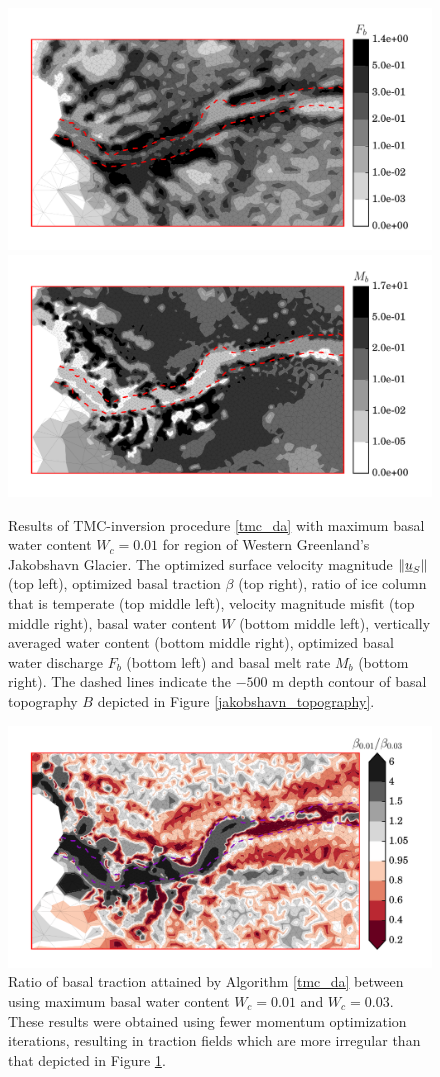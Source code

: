 \begin{figure}
    \includegraphics[width=0.48\linewidth]{images/internal_energy/jakob_results/inversion_Wc_0.01/Fb.pdf}
    \quad
    \includegraphics[width=0.48\linewidth]{images/internal_energy/jakob_results/inversion_Wc_0.01/Mb.pdf}
  \caption[Jakobshavn simulation results]{Results of TMC-inversion procedure \ref{tmc_da} with maximum basal water content $W_c = 0.01$ for region of Western Greenland's Jakobshavn Glacier.  The optimized surface velocity magnitude $\Vert \underline{u}_S \Vert$ (top left), optimized basal traction $\beta$ (top right), ratio of ice column that is temperate (top middle left), velocity magnitude misfit (top middle right), basal water content $W$ (bottom middle left), vertically averaged water content (bottom middle right), optimized basal water discharge $F_b$ (bottom left) and basal melt rate $M_b$ (bottom right).  The dashed lines indicate the $-500$ m depth contour of basal topography $B$ depicted in Figure \ref{jakobshavn_topography}.}
  \label{jakobshavn_results}
\end{figure}

\begin{figure}
  \centering
    \includegraphics[width=\linewidth]{images/internal_energy/jakob_results/deltas/delta_beta.pdf}
  \caption[Effect of water content on basal traction]{Ratio of basal traction attained by Algorithm \ref{tmc_da} between using maximum basal water content $W_c = 0.01$ and $W_c = 0.03$.  These results were obtained using fewer momentum optimization iterations, resulting in traction fields which are more irregular than that depicted in Figure \ref{jakobshavn_results}.}
  \label{deltas}
\end{figure}


